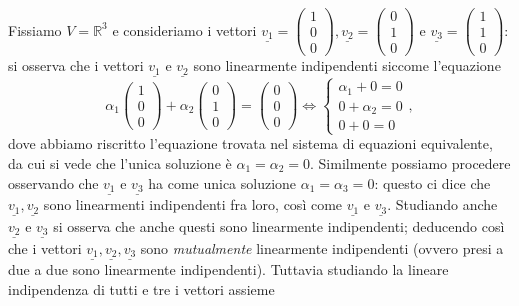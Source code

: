 \begin{example}
    Fissiamo $V = \mathbb{R}^3$ e consideriamo i vettori $\underline{v_1} = \begin{pmatrix} 1 \\ 0 \\ 0 \end{pmatrix}, \underline{v_2} = \begin{pmatrix} 0 \\ 1 \\ 0 \end{pmatrix}$ e $\underline{v_3} = \begin{pmatrix} 1 \\ 1 \\ 0 \end{pmatrix}$: si osserva che i vettori $\underline{v_1}$ e $\underline{v_2}$ sono linearmente indipendenti siccome l'equazione
    $$
        \alpha_1 \begin{pmatrix} 1 \\ 0 \\ 0 \end{pmatrix} + \alpha_2 \begin{pmatrix} 0 \\ 1 \\ 0 \end{pmatrix} = \begin{pmatrix} 0 \\ 0 \\ 0 \end{pmatrix} \iff \begin{cases} \alpha_1 + 0 = 0 \\ 0 + \alpha_2 = 0 \\ 0 + 0 = 0 \end{cases},
    $$
    dove abbiamo riscritto l'equazione trovata nel sistema di equazioni equivalente, da cui si vede che l'unica soluzione è $\alpha_1 = \alpha_2 = 0$. Similmente possiamo procedere osservando che $\underline{v_1}$ e $\underline{v_3}$ ha come unica soluzione $\alpha_1 = \alpha_3 = 0$: questo ci dice che $\underline{v_1}, \underline{v_2}$ sono linearmenti indipendenti fra loro, così come $\underline{v_1}$ e $\underline{v_3}$. Studiando anche $\underline{v_2}$ e $\underline{v_3}$ si osserva che anche questi sono linearmente indipendenti; deducendo così che i vettori $\underline{v_1}, \underline{v_2}, \underline{v_3}$
    sono \emph{mutualmente} linearmente indipendenti (ovvero presi a due a due sono linearmente indipendenti). Tuttavia studiando la lineare indipendenza di tutti e tre i vettori assieme

\end{example}
